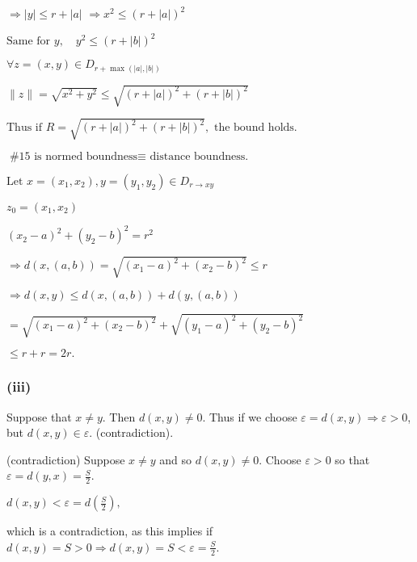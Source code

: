 \documentclass{article}
\theoremstyle{definition}
\numberwithin{equation}{section}
\begin{document}
\begin{center}
\end{center}

$
\Rightarrow |y| \leq r + |a| 
$
$
\Rightarrow x^2 \leq (r + |a|)^2 
$

$
\text{Same for } y, \quad y^2 \leq (r + |b|)^2 
$

$
\forall z = (x,y) \in D_{r + \max(|a|, |b|)}
$

$
\|z\| = \sqrt{x^2 + y^2} \leq \sqrt{(r + |a|)^2 + (r + |b|)^2} 
$

$
\text{Thus if } R = \sqrt{(r + |a|)^2 + (r + |b|)^2}, \text{ the bound holds.} 
$

$
\text{\#15 is normed boundness} \equiv \text{ distance boundness.}
$

$
\text{Let } x = (x_1, x_2), y = (y_1, y_2) \in D_{r \to xy}
$

$
z_0 = (x_1, x_2)
$

$
{(x_2 - a)^2 + (y_2 - b)^2 = r^2} 
$

$
\Rightarrow d(x, (a,b)) = \sqrt{(x_1 - a)^2 + (x_2 - b)^2} \leq r 
$

$
\Rightarrow d(x, y) \leq d(x, (a,b)) + d(y, (a,b))
$

$
= \sqrt{(x_1 - a)^2 + (x_2 - b)^2} + \sqrt{(y_1 - a)^2 + (y_2 - b)^2}
$

$
\leq r + r = 2r.
$

\subsubsection*{(iii)}
Suppose that \( x \neq y \). Then \( d(x,y) \neq 0 \). Thus if we choose \(\varepsilon = d(x,y) \Rightarrow \varepsilon > 0 \), but \( d(x,y) \in \varepsilon \). (contradiction).

\medskip

(contradiction) Suppose \( x \neq y \) and so \( d(x,y) \neq 0 \). Choose \(\varepsilon > 0\) so that \(\varepsilon = d(y,x) = \frac{S}{2}\).

$
d(x,y) < \varepsilon = d\left( \frac{S}{2} \right),
$

which is a contradiction, as this implies if \( d(x,y) = S > 0 \Rightarrow d(x,y) = S < \varepsilon = \frac{S}{2} \).
\end{document}
